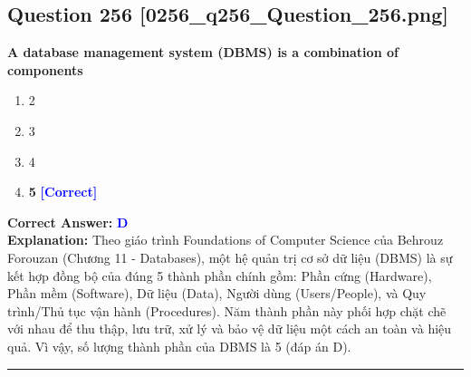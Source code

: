 \documentclass[11pt,a4paper]{article}
\begin{document}
\begin{minipage}{\textwidth}
\subsection*{Question 256 \quad \footnotesize{[0256\_q256\_Question\_256.png]}}
\noindent \textbf{A database management system (DBMS) is a combination of components}

\begin{enumerate}[label=\Alph*.]
    \item 2
    \item 3
    \item 4
    \item \textbf{5} \hfill \textcolor{blue}{\textbf{[Correct]}}
\end{enumerate}

\noindent \textbf{Correct Answer:} \textcolor{blue}{\textbf{D}} \\[2pt]
\noindent \textbf{Explanation:} Theo giáo trình Foundations of Computer Science của Behrouz Forouzan (Chương 11 - Databases), một hệ quản trị cơ sở dữ liệu (DBMS) là sự kết hợp đồng bộ của đúng 5 thành phần chính gồm: Phần cứng (Hardware), Phần mềm (Software), Dữ liệu (Data), Người dùng (Users/People), và Quy trình/Thủ tục vận hành (Procedures). Năm thành phần này phối hợp chặt chẽ với nhau để thu thập, lưu trữ, xử lý và bảo vệ dữ liệu một cách an toàn và hiệu quả. Vì vậy, số lượng thành phần của DBMS là 5 (đáp án D).

\par\vspace{0.3cm}
\hrule
\vspace{0.3cm}
\end{minipage}
\end{document}

